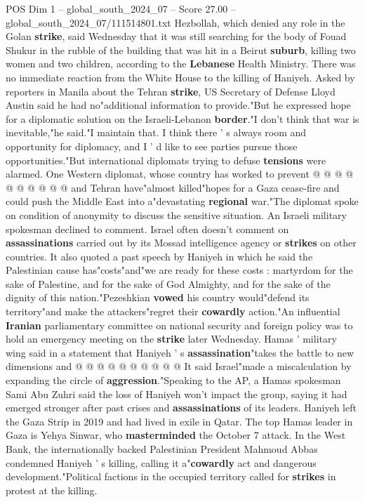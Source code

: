 \begin{textsample}{POS Dim 1 – global\_south\_2024\_07 – Score 27.00 – global\_south\_2024\_07/111514801.txt}
Hezbollah, which denied any role in the Golan \textbf{strike}, said Wednesday that it was still searching for the body of Fouad Shukur in the rubble of the building that was hit in a Beirut \textbf{suburb}, killing two women and two children, according to the \textbf{Lebanese} Health Ministry.
There was no immediate reaction from the White House to the killing of Haniyeh.
Asked by reporters in Manila about the Tehran \textbf{strike}, US Secretary of Defense Lloyd Austin said he had no"additional information to provide."But he expressed hope for a diplomatic solution on the Israeli-Lebanon \textbf{border}."I don't think that war is inevitable,"he said."I maintain that.
I think there ' s always room and opportunity for diplomacy, and I ' d like to see parties pursue those opportunities."But international diplomats trying to defuse \textbf{tensions} were alarmed.
One Western diplomat, whose country has worked to prevent @ @ @ @ @ @ @ @ @ @ and Tehran have"almost killed"hopes for a Gaza cease-fire and could push the Middle East into a"devastating \textbf{regional} war."The diplomat spoke on condition of anonymity to discuss the sensitive situation.
An Israeli military spokesman declined to comment.
Israel often doesn't comment on \textbf{assassinations} carried out by its Mossad intelligence agency or \textbf{strikes} on other countries.
It also quoted a past speech by Haniyeh in which he said the Palestinian cause has"costs"and"we are ready for these costs : martyrdom for the sake of Palestine, and for the sake of God Almighty, and for the sake of the dignity of this nation."Pezeshkian \textbf{vowed} his country would"defend its territory"and make the attackers"regret their \textbf{cowardly} action."An influential \textbf{Iranian} parliamentary committee on national security and foreign policy was to hold an emergency meeting on the \textbf{strike} later Wednesday.
Hamas ' military wing said in a statement that Haniyeh ' s \textbf{assassination}"takes the battle to new dimensions and @ @ @ @ @ @ @ @ @ @ It said Israel"made a miscalculation by expanding the circle of \textbf{aggression}."Speaking to the AP, a Hamas spokesman Sami Abu Zuhri said the loss of Haniyeh won't impact the group, saying it had emerged stronger after past crises and \textbf{assassinations} of its leaders.
Haniyeh left the Gaza Strip in 2019 and had lived in exile in Qatar.
The top Hamas leader in Gaza is Yehya Sinwar, who \textbf{masterminded} the October 7 attack.
In the West Bank, the internationally backed Palestinian President Mahmoud Abbas condemned Haniyeh ' s killing, calling it a"\textbf{cowardly} act and dangerous development."Political factions in the occupied territory called for \textbf{strikes} in protest at the killing.

\end{textsample}
